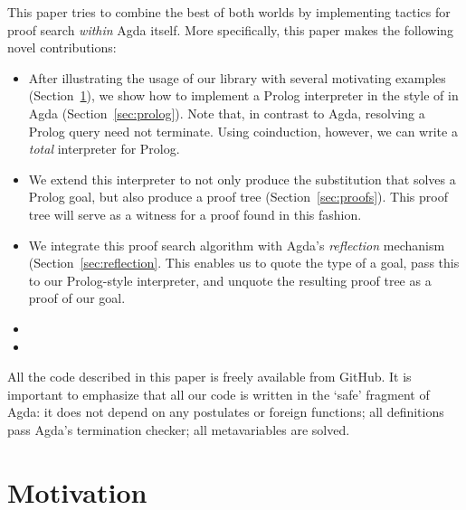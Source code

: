 \documentclass[preprint]{sigplanconf}
\begin{document}
This paper tries to combine the best of both worlds by implementing
tactics for proof search \emph{within} Agda itself. More specifically,
this paper makes the following novel contributions:

\begin{itemize}
\item 
  After illustrating the usage of our library with several motivating
  examples (Section~\ref{sec:motivation}), 
  we show how to implement a Prolog interpreter in the style of
  \citet{stutterheim} in Agda (Section~\ref{sec:prolog}). Note that,
  in contrast to Agda, resolving a Prolog query need not terminate. Using coinduction,
  however, we can write a \emph{total} interpreter for Prolog.
\item
  We extend this interpreter to not only produce the substitution that
  solves a Prolog goal, but also produce a proof tree
  (Section~\ref{sec:proofs}). This proof tree will serve
  as a witness for a proof found in this fashion.
\item
  We integrate this proof search algorithm with Agda's \emph{reflection}
  mechanism (Section~\ref{sec:reflection}. This enables
  us to quote the type of a goal, pass this to our Prolog-style
  interpreter, and unquote the resulting proof tree as a proof of our
  goal.
\item
   
\item
\end{itemize}

All the code described in this paper is freely available from
GitHub. It is important to emphasize that all our code
is written in the `safe' fragment of Agda: it does not depend on any
postulates or foreign functions; all definitions pass Agda's
termination checker; all metavariables are solved.


\section{Motivation}
\label{sec:motivation}
\end{document}
